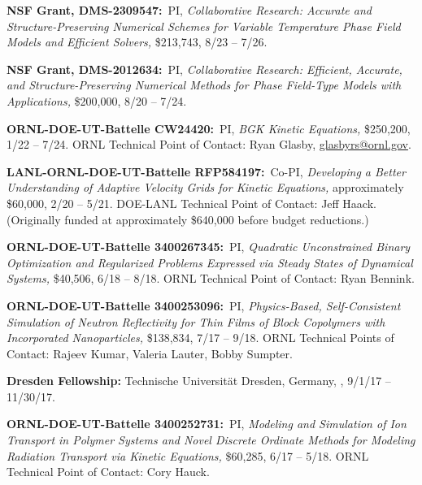 \documentclass[10pt,letterpaper]{article}
\begin{document}
    \begin{description} 

	\item
\textbf{NSF Grant, DMS-2309547:}~PI, {\sl Collaborative Research: Accurate and Structure-Preserving Numerical Schemes for Variable Temperature Phase Field Models and Efficient Solvers,} \$213,743, 8/23 -- 7/26.
    
    \item
\textbf{NSF Grant, DMS-2012634:}~PI, {\sl Collaborative Research:  Efficient, Accurate, and Structure-Preserving Numerical Methods for Phase Field-Type Models with Applications,} \$200,000, 8/20 -- 7/24.
    
    \item
\textbf{ORNL-DOE-UT-Battelle CW24420:}~PI, {\sl BGK Kinetic Equations,} \$250,200, 1/22 -- 7/24. ORNL Technical Point of Contact: Ryan Glasby, \href{mailto:glasbyrs@ornl.gov}{glasbyrs@ornl.gov}.
    
    \item
\textbf{LANL-ORNL-DOE-UT-Battelle RFP584197:}~Co-PI, {\sl Developing a Better Understanding of Adaptive Velocity Grids for Kinetic Equations,} approximately \$60,000, 2/20 -- 5/21. DOE-LANL Technical Point of Contact: Jeff Haack. (Originally funded at approximately \$640,000 before budget reductions.)
 
    \item
\textbf{ORNL-DOE-UT-Battelle 3400267345:}~PI, {\sl Quadratic Unconstrained Binary Optimization and Regularized Problems Expressed via Steady States of Dynamical Systems,} \$40,506, 6/18 -- 8/18. ORNL Technical Point of Contact: Ryan Bennink.
    
    \item
\textbf{ORNL-DOE-UT-Battelle 3400253096:}~PI, {\sl Physics-Based, Self-Consistent Simulation of Neutron Reflectivity for Thin Films of Block Copolymers with Incorporated Nanoparticles,} \$138,834, 7/17 -- 9/18. ORNL Technical Points of Contact: Rajeev Kumar, Valeria Lauter, Bobby Sumpter.

    \item
\textbf{Dresden Fellowship:} Technische Universit\"{a}t Dresden, Germany,  , 9/1/17 -- 11/30/17.
    
    \item
\textbf{ORNL-DOE-UT-Battelle 3400252731:}~PI, {\sl Modeling and Simulation of Ion Transport in Polymer Systems and Novel Discrete Ordinate Methods for Modeling Radiation Transport via Kinetic Equations,} \$60,285, 6/17 -- 5/18. ORNL Technical Point of Contact: Cory Hauck.


\end{description}
\end{document}
